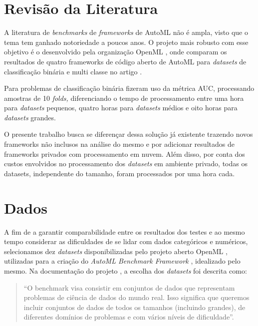 \documentclass[9pt, a4paper, twocolumn]{article}
\begin{document}
\hypertarget{revisuxe3o-da-literatura}{%
\section{Revisão da Literatura}\label{revisuxe3o-da-literatura}}

A literatura de \emph{benchmarks} de \emph{frameworks} de AutoML não é ampla, visto que o tema tem ganhado notoriedade a poucos anos. O projeto mais robusto com esse objetivo é o desenvolvido pela organização OpenML \cite{openml}, onde comparam os resultados de quatro frameworks de código aberto de AutoML para \emph{datasets} de classificação binária e multi classe no artigo \cite{amlb2019}.

Para problemas de classificação binária fizeram uso da métrica AUC, processando amostras de 10 \emph{folds,} diferenciando o tempo de processamento entre uma hora para \emph{datasets} pequenos, quatro horas para \emph{datasets} médios e oito horas para \emph{datasets} grandes.

O presente trabalho busca se diferençar dessa solução já existente trazendo novos frameworks não inclusos na análise do mesmo e por adicionar resultados de frameworks privados com processamento em nuvem. Além disso, por conta dos custos envolvidos no processamento dos \emph{datasets} em ambiente privado, todas os datasets, independente do tamanho, foram processados por uma hora cada.

\hypertarget{dados}{%
\section{Dados}\label{dados}}

A fim de a garantir comparabilidade entre os resultados dos testes e ao mesmo tempo considerar as dificuldades de se lidar com dados categóricos e numéricos, selecionamos dez \emph{datasets} disponibilizadas pelo projeto aberto OpenML \cite{openml}, utilizadas para a criação do \emph{AutoML Benchmark Framework} \cite{amlb2019}, idealizado pelo mesmo. Na documentação do projeto \cite{amlb2019}, a escolha dos \emph{datasets} foi descrita como:

\begin{quote}
``O benchmark visa consistir em conjuntos de dados que representam problemas de ciência de dados do mundo real. Isso significa que queremos incluir conjuntos de dados de todos os tamanhos (incluindo grandes), de diferentes domínios de problemas e com vários níveis de dificuldade''.\cite{amlb2019}
\end{quote}
\end{document}
